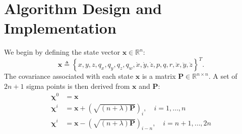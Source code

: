 \chapter{Algorithm Design and Implementation}

We begin by defining the state vector $\mathbf{x} \in \mathbb{R}^{n}$:
\begin{equation}
\mathbf{x} \triangleq \left\lbrace
x,
y,
z,
q_{x},
q_{y},
q_{z},
q_{w},
\dot{x},
\dot{y},
\dot{z},
p,
q,
r,
\ddot{x},
\ddot{y},
\ddot{z}
\right\rbrace ^{T}.
\end{equation}
The covariance associated with each state $\mathbf{x}$ is a matrix $\mathbf{P} \in \mathbb{R}^{n \times n}$. A set of $2n + 1$ sigma points is then derived from $\mathbf{x}$ and $\mathbf{P}$:
\begin{align}
\mathbf{\chi}^{0} &= \mathbf{x} \nonumber\\
\mathbf{\chi}^{i} &= \mathbf{x} + \left( \sqrt{\left( n + \lambda \right) \mathbf{P} } \right)_{i}, \quad i = 1, \dots, n \\
\mathbf{\chi}^{i} &= \mathbf{x} - \left( \sqrt{\left( n + \lambda \right) \mathbf{P} } \right)_{i-n}, \quad i = n+1, \dots, 2n \nonumber
\end{align}